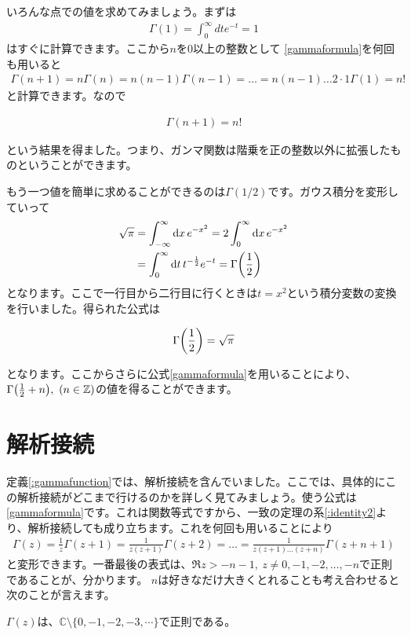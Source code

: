 \documentclass[report,paper=a4, fontsize=12pt, line_length=16cm, number_of_lines=33,dvipdfmx]{jlreq}
\newenvironment{important}{\begin{tcolorbox}[
  colback = white,
  colframe = red!35,
  boxrule = 2mm,
  fonttitle = \bfseries,
  after = \noindent] }{\end{tcolorbox}}
\numberwithin{equation}{section}
\newcommand{\Cb}{\mathbb{C}}
\newcommand{\Zb}{\mathbb{Z}}
\begin{document}
いろんな点での値を求めてみましょう。まずは
\begin{align}
  \Gamma(1)=\int_{0}^{\infty} dt e^{-t}=1
\end{align}
はすぐに計算できます。ここから$n$を$0$以上の整数として
\eqref{gammaformula}を何回も用いると
\begin{align}
  \Gamma(n+1)=n\Gamma(n)=n(n-1)\Gamma(n-1)=\dots
  =n(n-1)\dots 2\cdot 1 \Gamma(1)=n!
\end{align}
と計算できます。なので
\begin{important}
\begin{align}
  \Gamma(n+1)=n!  \label{gammafactorial}
\end{align}
\end{important}
という結果を得ました。つまり、ガンマ関数は階乗を正の整数以外に拡張したものということができます。

もう一つ値を簡単に求めることができるのは$\Gamma(1/2)$です。ガウス積分を変形していって
\begin{align}
  \sqrt{\pi}&=\int_{-\infty}^{\infty}\dd{x}e^{-x^2}
  =2\int_{0}^{\infty}\dd{x}e^{-x^2}\nonumber\\
&=\int_{0}^{\infty}\dd{t} t^{-\frac12}e^{-t}=\Gamma\qty(\frac12)
\end{align}
となります。ここで一行目から二行目に行くときは$t=x^2$という積分変数の変換を行いました。得られた公式は
\begin{important}
  \begin{align}
    \Gamma\qty(\frac12)=\sqrt{\pi}
  \end{align}
\end{important}
となります。ここからさらに公式\eqref{gammaformula}を用いることにより、$\Gamma\qty(\frac12 +n),\ (n\in \Zb)$の値を得ることができます。

\section{解析接続}
定義\ref{:gammafunction}では、解析接続を含んでいました。ここでは、具体的にこの解析接続がどこまで行けるのかを詳しく見てみましょう。使う公式は\eqref{gammaformula}です。これは関数等式ですから、一致の定理の系\ref{:identity2}より、解析接続しても成り立ちます。これを何回も用いることにより
\begin{align}
  \Gamma(z)=\frac{1}{z}\Gamma(z+1)=\frac{1}{z(z+1)}\Gamma(z+2)=\dots
  =\frac{1}{z(z+1)\dots(z+n)} \Gamma(z+n+1)\label{gammaproduct1}
\end{align}
と変形できます。一番最後の表式は、$\Re z > -n-1,\ z\ne 0,-1,-2,\dots,-n$で正則であることが、分かります。
$n$は好きなだけ大きくとれることも考え合わせると次のことが言えます。
\begin{important}
  $\Gamma(z)$は、$\Cb\setminus \{0,-1,-2,-3,\cdots\}$で正則である。
\end{important}
\end{document}
